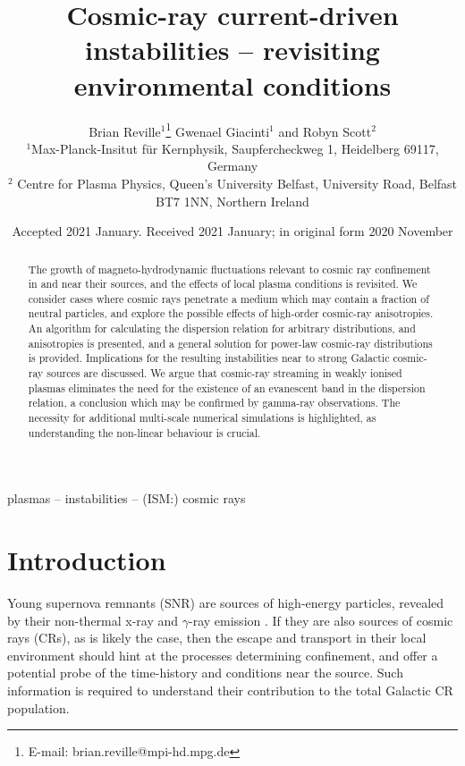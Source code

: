 \documentclass[a4paper,fleqn,usenatbib]{mnras}
\title[CR current-driven instabilities near sources]{Cosmic-ray current-driven instabilities -- revisiting environmental conditions}
\author[Reville, Giacinti \& Scott]{
Brian Reville$^{1}$\thanks{E-mail: brian.reville@mpi-hd.mpg.de }
Gwenael Giacinti$^{1}$ and Robyn Scott$^{2}$
\\
$^{1}$Max-Planck-Insitut f\"ur Kernphysik, Saupfercheckweg 1, Heidelberg 69117, Germany\\
$^{2}$ Centre for Plasma Physics, Queen's University Belfast, University Road, Belfast BT7 1NN, Northern Ireland
}
\date{Accepted 2021 January. Received 2021 January; in original form 2020 November }
\begin{document}
\label{firstpage}
\pagerange{\pageref{firstpage}--\pageref{lastpage}}
\maketitle

\begin{abstract}
The growth of magneto-hydrodynamic fluctuations relevant to cosmic ray confinement in and near their sources, and the effects of local plasma conditions is revisited. We consider cases where cosmic rays penetrate a medium which may contain a fraction of neutral particles, and explore the possible effects of high-order cosmic-ray  anisotropies. An algorithm for calculating the dispersion relation for arbitrary distributions, and anisotropies is presented, and a general solution for power-law cosmic-ray distributions is provided. Implications for the resulting instabilities near to strong Galactic cosmic-ray sources are discussed. We argue that cosmic-ray streaming in weakly ionised plasmas eliminates the need for the existence of an evanescent band in the dispersion relation, a conclusion which may be confirmed by gamma-ray observations. The necessity for additional multi-scale numerical simulations is highlighted, as understanding the non-linear behaviour is crucial. 
\end{abstract}

\begin{keywords}
 plasmas -- instabilities -- (ISM:) cosmic rays
\end{keywords}



\section{Introduction}

Young supernova remnants (SNR) are sources of high-energy particles, revealed by their non-thermal x-ray and $\gamma$-ray emission \cite[e.g.][]{Berezhko,HintonHof}. If they are also sources of cosmic rays (CRs), as is likely the case, then the escape and transport in their local environment should hint at the processes determining confinement, and offer a potential probe of the time-history and conditions near the source. Such information is required to understand their contribution to the total Galactic CR population. 
\end{document}
